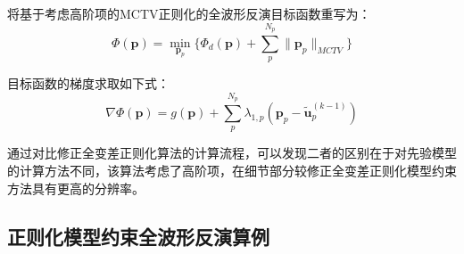 \documentclass[12pt]{article}
\begin{document}
\par
将基于考虑高阶项的MCTV正则化的全波形反演目标函数重写为：
\begin{equation}\label{4-44}
\Phi(\boldsymbol{p})=\min_{\boldsymbol{p}_p}\{\Phi_d(\boldsymbol{p})+\sum_p^{N_p}\parallel\boldsymbol{p}_p\parallel_{MCTV}\}
\end{equation}
\par
目标函数的梯度求取如下式：
\begin{equation}\label{4-45}
\nabla\Phi(\boldsymbol{p})=g(\boldsymbol{p})+\sum_p^{N_p}\lambda_{1,p}(\boldsymbol{p}_p-\tilde{\boldsymbol{u}}_p^{(k-1)})
\end{equation}
\par
通过对比修正全变差正则化算法的计算流程，可以发现二者的区别在于对先验模型的计算方法不同，该算法考虑了高阶项，在细节部分较修正全变差正则化模型约束方法具有更高的分辨率。
\subsection{正则化模型约束全波形反演算例}
\end{document}
